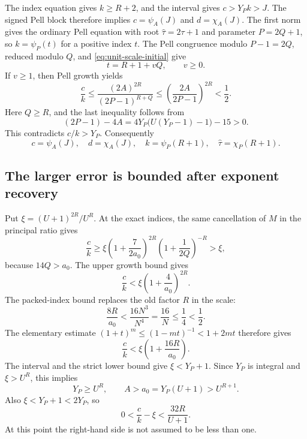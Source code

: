 The index equation gives $k\ge R+2$, and the interval gives
$c>Y_Pk>J$. The signed Pell block therefore implies
$c=\psi_A(J)$ and $d=\chi_A(J)$.
The first norm gives the ordinary Pell equation with root
$\widehat\tau=2\tau+1$ and parameter $P=2Q+1$, so
$k=\psi_P(t)$ for a positive index $t$.
The Pell congruence modulo $P-1=2Q$, reduced modulo $Q$, and
\eqref{eq:unit-scale-initial} give
\[
 t=R+1+vQ,\qquad v\ge0.
\]
If $v\ge1$, then Pell growth yields
\[
 \frac ck\le\frac{(2A)^{2R}}{(2P-1)^{R+Q}}
 \le\left(\frac{2A}{2P-1}\right)^{2R}<\frac12.
\]
Here $Q\ge R$, and the last inequality follows from
\[
 (2P-1)-4A=4Y_P\bigl(U(Y_P-1)-1\bigr)-15>0.
\]
This contradicts $c/k>Y_P$. Consequently
\begin{equation}\label{eq:unit-scale-indices}
 c=\psi_A(J),\quad d=\chi_A(J),\quad
 k=\psi_P(R+1),\quad\widehat\tau=\chi_P(R+1).
\end{equation}

\subsection{The larger error is bounded after exponent recovery}

Put $\xi=(U+1)^{2R}/U^R$. At the exact indices, the same cancellation
of $M$ in the principal ratio gives
\begin{equation}\label{eq:unit-scale-lower}
 \frac ck\ge
 \xi\left(1+\frac7{2a_0}\right)^{2R}
     \left(1+\frac1{2Q}\right)^{-R}>\xi,
\end{equation}
because $14Q>a_0$. The upper growth bound gives
\[
 \frac ck<\xi\left(1+\frac4{a_0}\right)^{2R}.
\]
The packed-index bound replaces the old factor $R$ in the scale:
\[
 \frac{8R}{a_0}<\frac{16N^3}{N^4}
 =\frac{16}{N}\le\frac14<\frac12.
\]
The elementary estimate $(1+t)^m\le(1-mt)^{-1}<1+2mt$
therefore gives
\begin{equation}\label{eq:unit-scale-upper}
 \frac ck<\xi\left(1+\frac{16R}{a_0}\right).
\end{equation}
The interval and the strict lower bound give $\xi<Y_P+1$.
Since $Y_P$ is integral and $\xi>U^R$, this implies
\begin{equation}\label{eq:unit-scale-size}
 Y_P\ge U^R,\qquad A>a_0=Y_P(U+1)>U^{R+1}.
\end{equation}
Also $\xi<Y_P+1<2Y_P$, so
\begin{equation}\label{eq:unit-scale-error-unbounded}
 0<\frac ck-\xi<\frac{32R}{U+1}.
\end{equation}
At this point the right-hand side is not assumed to be less than one.

